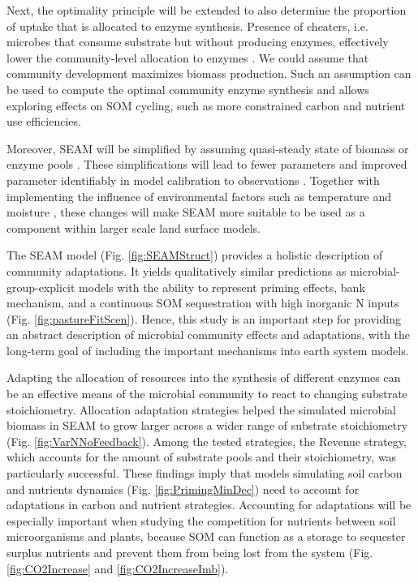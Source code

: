Next, the optimality principle will be extended to also determine the proportion
of uptake that is allocated to enzyme synthesis. Presence of cheaters, i.e.
microbes that consume substrate but without producing enzymes, effectively lower
the community-level allocation to enzymes \citep{Kaiser14}. We could assume
that community development maximizes biomass production. Such
an assumption can be used to compute the optimal community enzyme synthesis and allows
exploring effects on SOM cycling, such as more constrained carbon and nutrient
use efficiencies.

Moreover, SEAM will be simplified by assuming quasi-steady state of biomass or
enzyme pools \citep{Wutzler13}. These simplifications will lead to fewer
parameters and improved parameter identifiably in model calibration to
observations \citep{Xu14}.
Together with implementing the influence of environmental factors such as
temperature and moisture \citep{Davidson12}, these changes will make SEAM more
suitable to be used as a component within larger scale land surface models.
 
\conclusions
The SEAM model (Fig. \ref{fig:SEAMStruct}) provides a holistic description of
community adaptations. It yields qualitatively similar predictions as
microbial-group-explicit models with the ability to represent priming effects,
bank mechanism, and a continuous SOM sequestration with high inorganic N inputs
(Fig. \ref{fig:pastureFitScen}). Hence, this study is an important step
for providing an abstract description of microbial community effects and
adaptations, with the long-term goal of including the important mechanisms into
earth system models.

Adapting the allocation of resources into the synthesis of different enzymes can
be an effective means of the microbial community to react to changing substrate
stoichiometry. Allocation adaptation strategies helped the simulated microbial
biomass in SEAM to grow larger across a wider range of substrate stoichiometry
(Fig. \ref{fig:VarNNoFeedback}). Among the tested strategies, the Revenue
strategy, which accounts for the amount of substrate pools and their
stoichiometry, was particularly successful.
These findings imply that models simulating soil carbon and nutrients dynamics
(Fig. \ref{fig:PrimingMinDec}) need to account for adaptations in carbon and
nutrient strategies. Accounting for adaptations will be especially important
when studying the competition for nutrients between soil microorganisms and
plants, because SOM can function as a storage to sequester surplus nutrients and
prevent them from being lost from the system (Fig.
\ref{fig:CO2Increase} and \ref{fig:CO2IncreaseImb}).
